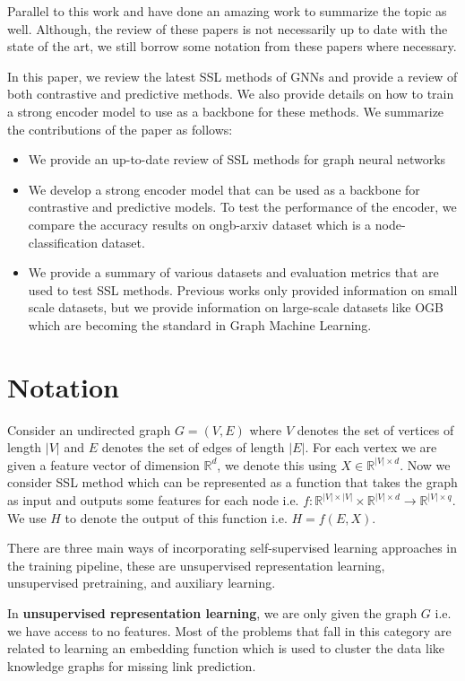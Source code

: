 \documentclass{article}
\begin{document}
Parallel to this work \citep{cite12} and \cite{cite13} have done an amazing work to summarize the topic as well. Although, the review of these papers is not necessarily up to date with the state of the art, we still borrow some notation from these papers where necessary.

In this paper, we review the latest SSL methods of GNNs and provide a review of both contrastive and predictive methods. We also provide details on how to train a strong encoder model to use as a backbone for these methods. We summarize the contributions of the paper as follows:
\begin{itemize}
    \item We provide an up-to-date review of SSL methods for graph neural networks
    \item We develop a strong encoder model that can be used as a backbone for contrastive and predictive models. To test the performance of the encoder, we compare the accuracy results on ongb-arxiv dataset which is a node-classification dataset.
    \item We provide a summary of various datasets and evaluation metrics that are used to test SSL methods. Previous works only provided information on small scale datasets, but we provide information on large-scale datasets like OGB which are becoming the standard in Graph Machine Learning.
\end{itemize}

\section{Notation}
Consider an undirected graph $G=(V,E)$ where $V$ denotes the set of vertices of length $|V|$ and $E$ denotes the set of edges of length $|E|$. For each vertex we are given a feature vector of dimension $\mathbb{R}^d$, we denote this using $X \in \mathbb{R}^{|V|\times d}$. Now we consider SSL method which can be represented as a function that takes the graph as input and outputs some features for each node i.e. $f: \mathbb{R}^{|V|\times |V|}\times \mathbb{R}^{|V|\times d} \rightarrow \mathbb{R}^{|V|\times q}$. We use $H$ to denote the output of this function i.e. $H = f(E, X)$.

There are three main ways of incorporating self-supervised learning approaches in the training pipeline, these are unsupervised representation learning, unsupervised pretraining, and auxiliary learning.

In \textbf{unsupervised representation learning}, we are only given the graph $G$ i.e. we have access to no features. Most of the problems that fall in this category are related to learning an embedding function which is used to cluster the data like knowledge graphs for missing link prediction.
\end{document}
